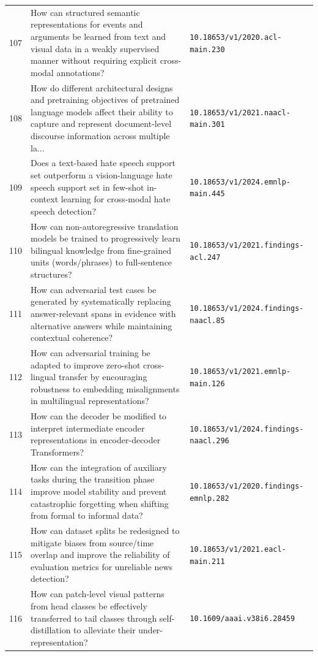 \documentclass[runningheads]{llncs}
\begin{document}
\begin{longtable}{@{}p{0.5cm}p{7.2cm}p{2.5cm}@{}}
107 & How can structured semantic representations for events and arguments be learned from text and visual data in a weakly supervised manner without requiring explicit cross-modal annotations? & \texttt{10.18653/v1/2020.acl-main.230} \\
108 & How do different architectural designs and pretraining objectives of pretrained language models affect their ability to capture and represent document-level discourse information across multiple la... & \texttt{10.18653/v1/2021.naacl-main.301} \\
109 & Does a text-based hate speech support set outperform a vision-language hate speech support set in few-shot in-context learning for cross-modal hate speech detection? & \texttt{10.18653/v1/2024.emnlp-main.445} \\
110 & How can non-autoregressive translation models be trained to progressively learn bilingual knowledge from fine-grained units (words/phrases) to full-sentence structures? & \texttt{10.18653/v1/2021.findings-acl.247} \\
111 & How can adversarial test cases be generated by systematically replacing answer-relevant spans in evidence with alternative answers while maintaining contextual coherence? & \texttt{10.18653/v1/2024.findings-naacl.85} \\
112 & How can adversarial training be adapted to improve zero-shot cross-lingual transfer by encouraging robustness to embedding misalignments in multilingual representations? & \texttt{10.18653/v1/2021.emnlp-main.126} \\
113 & How can the decoder be modified to interpret intermediate encoder representations in encoder-decoder Transformers? & \texttt{10.18653/v1/2024.findings-naacl.296} \\
114 & How can the integration of auxiliary tasks during the transition phase improve model stability and prevent catastrophic forgetting when shifting from formal to informal data? & \texttt{10.18653/v1/2020.findings-emnlp.282} \\
115 & How can dataset splits be redesigned to mitigate biases from source/time overlap and improve the reliability of evaluation metrics for unreliable news detection? & \texttt{10.18653/v1/2021.eacl-main.211} \\
116 & How can patch-level visual patterns from head classes be effectively transferred to tail classes through self-distillation to alleviate their under-representation? & \texttt{10.1609/aaai.v38i6.28459} \\

\end{longtable}
\end{document}
